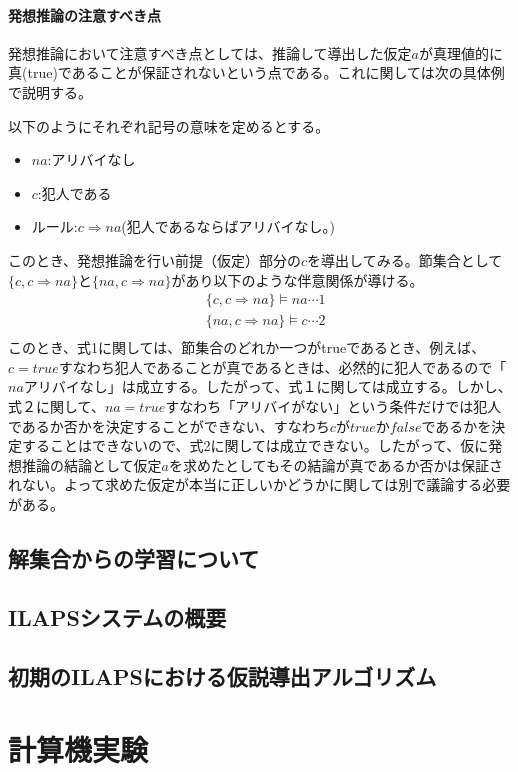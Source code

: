 \documentclass[dvipdfmx]{jsarticle}
\begin{document}
\paragraph{発想推論の注意すべき点}
発想推論において注意すべき点としては、推論して導出した仮定$a$が真理値的に真(true)であることが保証されないという点である。これに関しては次の具体例で説明する。\par
以下のようにそれぞれ記号の意味を定めるとする。
\begin{itemize}
  \item $na$:アリバイなし
  \item $c$:犯人である
  \item ルール:$c \Rightarrow na$(犯人であるならばアリバイなし。)
\end{itemize}
このとき、発想推論を行い前提（仮定）部分の$c$を導出してみる。節集合として$\{ c, c \Rightarrow na\}$と$\{ na, c \Rightarrow na\}$があり以下のような伴意関係が導ける。
\begin{align*}
  & \{c, c \Rightarrow na\} \models na  \cdots 1 \\
  & \{ na, c \Rightarrow na\} \models c \cdots 2 \\
\end{align*}
このとき、式1に関しては、節集合のどれか一つがtrueであるとき、例えば、$c = true$すなわち犯人であることが真であるときは、必然的に犯人であるので「$na$アリバイなし」は成立する。したがって、式１に関しては成立する。しかし、式２に関して、$na = true$すなわち「アリバイがない」という条件だけでは犯人であるか否かを決定することができない、すなわち$c$が$true$か$false$であるかを決定することはできないので、式2に関しては成立できない。したがって、仮に発想推論の結論として仮定$a$を求めたとしてもその結論が真であるか否かは保証されない。よって求めた仮定が本当に正しいかどうかに関しては別で議論する必要がある。
\subsection{解集合からの学習について}
\subsection{ILAPSシステムの概要}
\subsection{初期のILAPSにおける仮説導出アルゴリズム}

\section{計算機実験}
\end{document}
